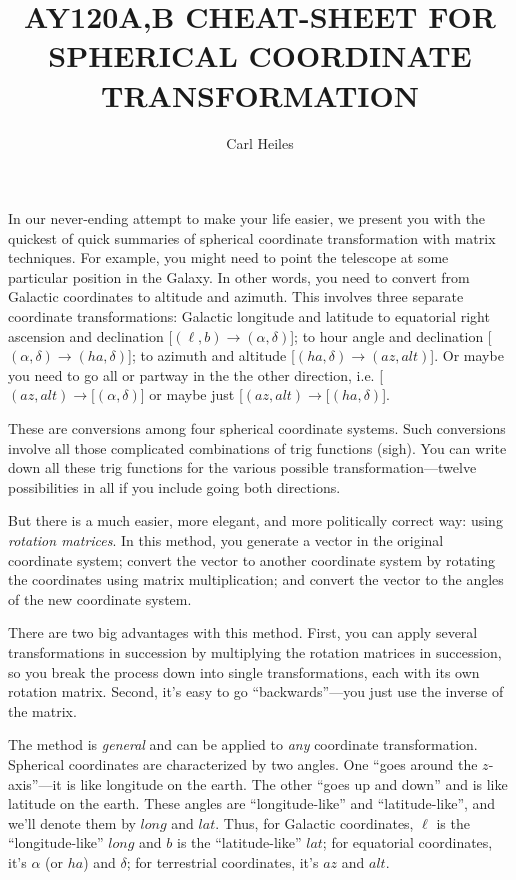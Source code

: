 \documentclass[11pt,preprint]{aastex}
\begin{document}
\title{AY120A,B CHEAT-SHEET FOR SPHERICAL COORDINATE TRANSFORMATION}
\author{Carl Heiles}

	In our never-ending attempt to make your life easier, we present
you with the quickest of quick summaries of spherical coordinate
transformation with matrix techniques.  For example, you might need to
point the telescope at some particular position in the Galaxy.  In other
words, you need to convert from Galactic coordinates to altitude and
azimuth.  This involves three separate coordinate transformations:
Galactic longitude and latitude to equatorial right ascension and
declination [$(\ell, b) \rightarrow (\alpha, \delta)$]; to hour angle
and declination [$(\alpha, \delta) \rightarrow (ha, \delta)$]; to
azimuth and altitude [$(ha, \delta) \rightarrow (az, alt)$].  Or maybe
you need to go all or partway in the the other direction, i.e.  [$(az,
alt) \rightarrow [(\alpha, \delta)$] or maybe just [$(az, alt)
\rightarrow [(ha, \delta)$]. 

	These are conversions among four spherical coordinate systems. 
Such conversions involve all those complicated combinations of trig
functions (sigh).  You can write down all these trig functions for the
various possible transformation---twelve possibilities in all if you
include going both directions. 

	But there is a much easier, more elegant, and more politically
correct way: using {\it rotation matrices}.   In this method, you
generate a vector in the original coordinate system; convert the vector
to another coordinate system by rotating the coordinates using matrix
multiplication; and convert the vector to the angles of the new
coordinate system.  

	There are two big advantages with this method.  First, you can
apply several transformations in succession by multiplying the rotation
matrices in succession, so you break the process down into single
transformations, each with its own rotation matrix.  Second, it's easy
to go ``backwards''---you just use the inverse of the matrix. 

	The method is {\it general} and can be applied to {\it any}
coordinate transformation.  Spherical coordinates are characterized by
two angles.  One ``goes around the $z$-axis''---it is like longitude on
the earth.  The other ``goes up and down'' and is like latitude on the
earth.  These angles are ``longitude-like'' and ``latitude-like'', and
we'll denote them by $long$ and $lat$.  Thus, for Galactic coordinates,
$\ell$ is the ``longitude-like'' $long$ and $b$ is the ``latitude-like''
$lat$; for equatorial coordinates, it's $\alpha$ (or $ha$) and $\delta$;
for terrestrial coordinates, it's $az$ and $alt$. 
\end{document}

